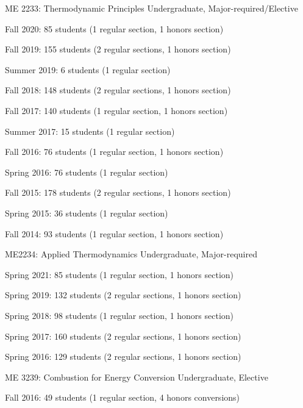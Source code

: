 \begin{outerlist}
    \item ME 2233: Thermodynamic Principles \hfill Undergraduate, Major-required/Elective
    \begin{innerlist}
        \item Fall 2020: 85 students (1 regular section, 1 honors section)
        \item Fall 2019: 155 students (2 regular sections, 1 honors section)
        \item Summer 2019: 6 students (1 regular section)
        \item Fall 2018: 148 students (2 regular sections, 1 honors section)
        \item Fall 2017: 140 students (1 regular section, 1 honors section)
        \item Summer 2017: 15 students (1 regular section)
        \item Fall 2016: 76 students (1 regular section, 1 honors section)
        \item Spring 2016: 76 students (1 regular section)
        \item Fall 2015: 178 students (2 regular sections, 1 honors section)
        \item Spring 2015: 36 students (1 regular section)
        \item Fall 2014: 93 students (1 regular section, 1 honors section)
    \end{innerlist}

    \item ME2234: Applied Thermodynamics \hfill Undergraduate, Major-required
    \begin{innerlist}
        \item Spring 2021: 85 students (1 regular section, 1 honors section)
        \item Spring 2019: 132 students (2 regular sections, 1 honors section)
        \item Spring 2018: 98 students (1 regular section, 1 honors section)
        \item Spring 2017: 160 students (2 regular sections, 1 honors section)
        \item Spring 2016: 129 students (2 regular sections, 1 honors section)
    \end{innerlist}

    \item ME 3239: Combustion for Energy Conversion \hfill Undergraduate, Elective
    \begin{innerlist}
        \item Fall 2016: 49 students (1 regular section, 4 honors conversions)
    \end{innerlist}


\end{outerlist}
